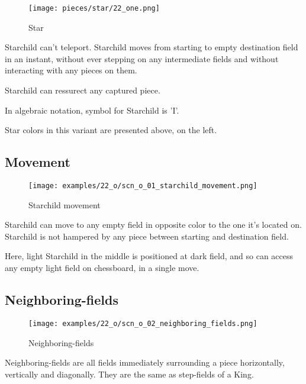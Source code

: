 \noindent
\begin{wrapfigure}[10]{l}{0.4\textwidth}
\centering
\texttt{[image: pieces/star/22\_one.png]}
\caption{Star}
\label{fig:star/22_one}
\end{wrapfigure}
Starchild can't teleport. Starchild moves from starting to empty destination field in
an instant, without ever stepping on any intermediate fields and without interacting
with any pieces on them.

Starchild can ressurect any captured piece.

In algebraic notation, symbol for Starchild is 'I'.

Star colors in this variant are presented above, on the left.

\clearpage %

\subsection*{Movement}

\vspace*{-1.1\baselineskip}
\noindent
\begin{figure}[!h]
\texttt{[image: examples/22\_o/scn\_o\_01\_starchild\_movement.png]}
\caption{Starchild movement}
\label{fig:scn_o_01_starchild_movement}
\end{figure}

Starchild can move to any empty field in opposite color to the one it's located on.
Starchild is not hampered by any piece between starting and destination field.

Here, light Starchild in the middle is positioned at dark field, and so can access
any empty light field on chessboard, in a single move.

\clearpage %

\subsection*{Neighboring-fields}

\vspace*{-0.9\baselineskip}
\noindent
\begin{wrapfigure}[5]{l}{0.4\textwidth}
\centering
\texttt{[image: examples/22\_o/scn\_o\_02\_neighboring\_fields.png]}
\caption{Neighboring-fields}
\label{fig:scn_o_02_neighboring_fields}
\end{wrapfigure}
Neighboring-fields are all fields immediately surrounding a piece horizontally, vertically
and diagonally. They are the same as step-fields of a King.

